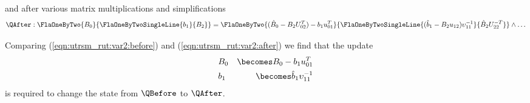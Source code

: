 and after various matrix multiplications and simplifications
\begin{equation}
\label{eqn:utrsm_rut:var2:after}
\QAfter: 
\FlaOneByTwo{ B_{0} }{ \FlaOneByTwoSingleLine{ b_{1} } { B_{2} }  }
=
\FlaOneByTwo { ( \hat{B}_0 - B_{2} U_{02}^{T} ) - b_{1} u_{01}^{T} }
             {
               \FlaOneByTwoSingleLine { ( \hat{b}_1 - B_2 u_{12} ) \upsilon_{11}^{-1} }
                                      { \hat{B}_{2} U_{22}^{-T} } } 
\wedge \ldots
\end{equation}


Comparing 
(\ref{eqn:utrsm_rut:var2:before}) and
(\ref{eqn:utrsm_rut:var2:after})
we find that the update
\begin{eqnarray*}
& B_0   & \becomes B_0 -  b_{1} u_{01}^T  \\
& b_{1} & \becomes \hat{b}_{1} \upsilon_{11}^{-1}
\end{eqnarray*}
is required to change the state from $ \QBefore $
to $ \QAfter $.




\renewcommand{\invariant}{
\FlaOneByTwo{ B_L}{B_R} =
\FlaOneByTwo{ \hat{B}_{L} - B_{R} U_{TR}^{T} }
            { \hat{B}_{R} U_{BR}^{-T}        }
\wedge
\ldots
}

\renewcommand{\guard}{ \neg \SameSize( B, B_{BR} ) }

\renewcommand{\partitionings}{
$ 
B \rightarrow \FlaOneByTwo{ B_L }
                          { B_R }
$,
$ 
\hat{B} \rightarrow \FlaOneByTwo{ \hat{B}_L }
                                { \hat{B}_R }
$, and
$ 
U \rightarrow \FlaOneByTwo{ U_{TL} }{ U_{TR} }
                          {   0    }{ U_{BR} }
$
}
\renewcommand{\partitionsizes}{
$ B_R $ and $ \hat{B}_R $ have $ 0 $ rows
and $ U_{BR} $ is $ 0 \times 0 $
}

\renewcommand{\repartitionings}{
$ 
\FlaOneByTwo{ B_L }
            { B_R } 
\rightarrow
\FlaOneByThreeL{ B_0 }
               { b_1 }
               { B_2 },
\FlaOneByTwo{ \hat{B}_L }
            { \hat{B}_R } 
\rightarrow
\FlaOneByThreeL{ \hat{B}_0 }
               { \hat{b}_1 }
               { \hat{B}_2 }
$ \\
and
$ 
\FlaTwoByTwo{ U_{TL} }{ U_{TR} }
            {   0    }{ U_{BR} } 
\rightarrow
\FlaThreeByThreeTL{ U_{00} } { u_{01}        } { U_{02}     }
                  {   0    } { \upsilon_{11} } { u_{12}^{T} }
                  {   0    } {    0          } { U_{22}     }
$
}
\renewcommand{\repartitionsizes}{
$ b_1 $ and $ \hat{b}_1 $ are columns 
and $ \upsilon_{11} $ is a scalar
 }

